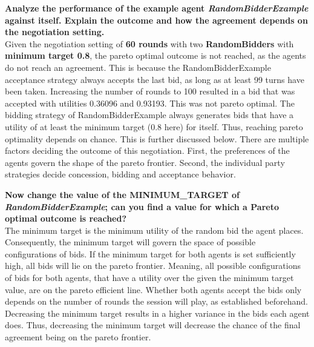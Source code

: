 \documentclass[a4paper,11pt]{article}
\theoremstyle{mytheor}
\begin{document}
\textbf{Analyze the performance of the example agent \emph{RandomBidderExample}  against itself. Explain the outcome and how the agreement depends on the negotiation setting.}\\
Given the negotiation setting of \textbf{60 rounds} with two \textbf{RandomBidders} with \textbf{minimum target 0.8}, the pareto optimal outcome is not reached, as the agents do not reach an agreement. This is because the RandomBidderExample acceptance strategy always accepts the last bid, as long as at least 99 turns have been taken. Increasing the number of rounds to 100 resulted in a bid that was accepted with utilities 0.36096 and 0.93193. This was not pareto optimal. The bidding strategy of RandomBidderExample always generates bids that have a utility of at least the minimum target (0.8 here) for itself. 
Thus, reaching pareto optimality depends on chance. This is further discussed below. There are multiple factors deciding the outcome of this negotiation. First, the preferences of the agents govern the shape of the pareto frontier. Second, the individual party strategies decide concession, bidding and acceptance behavior.
\newline %


\textbf{Now change the value of the MINIMUM\_TARGET of \emph{RandomBidderExample}; can you find a value for which a Pareto optimal outcome is reached?}\\
The minimum target is the minimum utility of the random bid the agent places. Consequently, the minimum target will govern the space of possible configurations of bids. If the minimum target for both agents is set sufficiently high, all bids will lie on the pareto frontier. Meaning, all possible configurations of bids for both agents, that have a utility over the given the minimum target value, are on the pareto efficient line. Whether both agents accept the bids only depends on the number of rounds the session will play, as established beforehand. Decreasing the minimum target results in a higher variance in the bids each agent does. Thus, decreasing the minimum target will decrease the chance of the final agreement being on the pareto frontier.\newline
\end{document}
